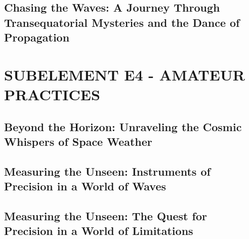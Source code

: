 \documentclass[12pt]{book}
\begin{document}
\section{Chasing the Waves: A Journey Through Transequatorial Mysteries and the Dance of Propagation}













\chapter{SUBELEMENT E4 - AMATEUR PRACTICES}
\section{Beyond the Horizon: Unraveling the Cosmic Whispers of Space Weather}












\section{Measuring the Unseen: Instruments of Precision in a World of Waves}











\section{Measuring the Unseen: The Quest for Precision in a World of Limitations}











\end{document}
